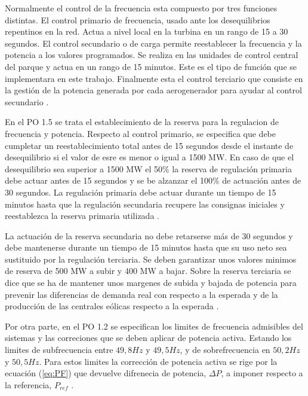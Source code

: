 \documentclass{book}
\begin{document}
Normalmente el control de la frecuencia esta compuesto por tres funciones distintas. El control primario de frecuencia, usado ante los desequilibrios repentinos en la red. Actua a nivel local en la turbina en un rango de 15 a 30 segundos. El control secundario o de carga permite reestablecer la frecuencia y la potencia a los valores programados. Se realiza en las unidades de control central del parque y actua en un rango de 15 minutos. Este es el tipo de funci\'on que se implementara en este trabajo. Finalmente esta el control terciario que consiste en la gesti\'on de la potencia generada por cada aerogenerador para ayudar al control secundario \cite{WFgridcode}. \par

En el PO 1.5 se trata el establecimiento de la reserva para la regulacion de frecuencia y potencia. Respecto al control primario, se especifica que debe cumpletar un reestablecimiento total antes de 15 segundos desde el instante de desequilibrio si el valor de esre es menor o igual a 1500 MW. En caso de que el desequilibrio sea superior a 1500 MW el 50\% la reserva de regulaci\'on primaria debe actuar antes de 15 segundos y se be alzanzar el 100\% de actuaci\'on antes de 30 segundos. La regulaci\'on primaria debe actuar durante un tiempo de 15 minutos hasta que la regulaci\'on secundaria recupere las consignas iniciales y reestablezca la reserva primaria utilizada \cite{PO15}. \par

La actuaci\'on de la reserva secundaria no debe retarserse m\'as de 30 segundos y debe mantenerse durante un tiempo de 15 minutos hasta que su uso neto sea sustituido por la regulaci\'on terciaria. Se deben garantizar unos valores minimos de reserva de 500 MW a subir y 400 MW a bajar. Sobre la reserva terciaria se dice que se ha de mantener unos margenes de subida y bajada de potencia para prevenir las diferencias de demanda real con respecto a la esperada y de la producci\'on de las centrales e\'olicas respecto a la esperada \cite{PO15}. \par

Por otra parte, en el PO 1.2 se especifican los limites de frecuencia admisibles del sistemas y las correciones que se deben aplicar de potencia activa. Estando los limites de subfrecuencia entre $49,8Hz$ y $49,5Hz$, y de sobrefrecuencia en $50,2Hz$ y $50,5Hz$. Para estos limites la correcci\'on de potencia activa se rige por la ecuaci\'on (\ref{eq:PF}) que devuelve difrenecia de potencia, $\Delta P$, a imponer respecto a la referencia, $P_{ref}$ \cite{PO12}. \par
\end{document}
